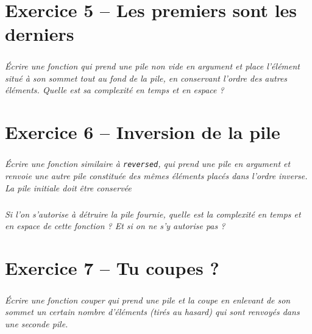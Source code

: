 
\section*{Exercice 5 -- Les premiers sont les derniers}

\setcounter{exo}{0}
\subparagraph*{}
\textit{Écrire une fonction qui prend une pile non vide en argument et place l’élément situé à
son sommet tout au fond de la pile, en conservant l’ordre des autres éléments.
Quelle est sa complexité en temps et en espace ?}
\ifprof
\begin{corrige}
\end{corrige}
\else
\fi

\section*{Exercice 6 -- Inversion de la pile}
\setcounter{exo}{0}
\subparagraph{}
\textit{Écrire une fonction similaire à \texttt{reversed}, qui prend une pile en argument et renvoie une autre pile constituée des mêmes éléments placés dans l’ordre inverse. La pile initiale doit être conservée}

\subparagraph{}
\textit{ Si l’on s’autorise à détruire la pile fournie, quelle est la complexité en temps et en espace de cette fonction ? Et si on ne s’y autorise pas ?}
\ifprof
\begin{corrige}
\end{corrige}
\else
\fi

\section*{Exercice 7 -- Tu coupes ?}
\setcounter{exo}{0}
\subparagraph*{}
\textit{Écrire une fonction couper qui prend une pile et la coupe en enlevant de son sommet un
certain nombre d’éléments (tirés au hasard) qui sont renvoyés dans une seconde pile.}

